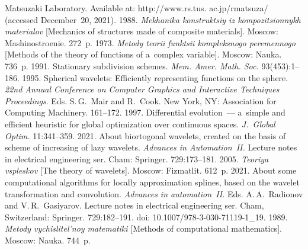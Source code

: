   \begin{multicols}{2}

\renewcommand{\bibname}{\protect\rmfamily References}

{\small\frenchspacing
 {%
 \begin{thebibliography}{99}
 Matsuzaki Laboratory. Available at: {\sf http://www.rs.tus. ac.jp/rmatsuza/} (accessed December~20, 
2021).
 1988. \textit{Mekhanika konstruktsiy iz kom\-po\-zi\-tsi\-on\-nykh materialov} 
[Mechanics of structures made of composite materials]. Moscow: Mashinostroenie. 272~p.
 1973. \textit{Metody teorii funktsii kompleksnogo 
peremennogo} [Methods of the theory of functions of a~complex variable]. Moscow: Nauka. 736~p.
 1991. Stationary subdivision schemes. 
\textit{Mem. Amer. Math. Soc.} 93(453):1--186.
 1995. Spherical wavelets: Efficiently representing functions on 
the sphere. \textit{22nd Annual Conference on Computer Graphics and Interactive Techniques 
Proceedings}. Eds. S.\,G.~Mair and R.~Cook. New York, NY: Association for Computing Machinery. 161--172.
 1997. Differential evolution~--- a~simple and efficient heuristic for 
global optimization over continuous spaces. \textit{J.~Global Optim.} 11:341--359.
 2021. About biortogonal wavelets, 
created on the basis of scheme of increasing of lazy wavelets. \textit{Advances in Automation~II.} 
Lecture notes in electrical engineering ser. Cham: Springer. 729:173--181. 
 2005. \textit{Teoriya vspleskov} [The 
theory of wavelets]. Moscow: Fizmatlit. 612~p.
 2021. About some computational 
algorithms for locally approximation splines, based on the wavelet transformation and convolution. 
\textit{Advances in automation~II.}
Eds. A.\,A.~Radionov and V.\,R.~Gasiyarov. Lecture notes in electrical engineering ser. Cham,
Switzerland: Springer. 
729:182--191.  doi: 
10.1007/978-3-030-71119-1\_19.
 1989. \textit{Metody vychislitel'noy matematiki} [Methods 
of computational mathematics]. Moscow: Nauka. 744~p.
\end{thebibliography}

 }
 }

\end{multicols}

